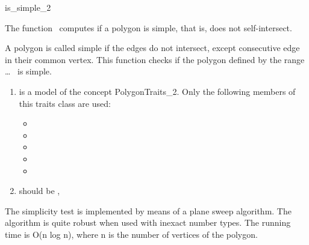 

\begin{ccRefFunction}{is_simple_2} 


\ccDefinition
  
The function \ccRefName\ computes if a polygon is simple, that is, does not
self-intersect.


{
A polygon is called simple if the edges do not intersect, except consecutive
edge in their common vertex. This function checks if the polygon defined by the
range  \ldots\  is simple.
}


\begin{enumerate}
    \item {} is a model of the concept 
	  PolygonTraits\_2.
	  Only the following members of this traits class are used:
          \begin{itemize}
            \item {}
            \item {}
            \item {}
            \item {}
            \item {}
          \end{itemize}
    \item {} should be ,
\end{enumerate}

\ccImplementation

The simplicity test is implemented by means of a plane sweep algorithm.
The algorithm is quite robust when used with inexact number types.
The running time is O(n log n), where n is the number of vertices of the
polygon.

\ccSeeAlso

 \\
 \\


\end{ccRefFunction}


